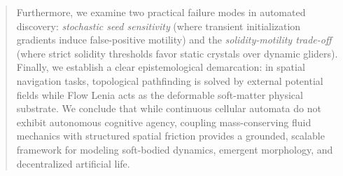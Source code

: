 \begin{abstract}
Furthermore, we examine two practical failure modes in automated discovery: \textit{stochastic seed sensitivity} (where transient initialization gradients induce false-positive motility) and the \textit{solidity-motility trade-off} (where strict solidity thresholds favor static crystals over dynamic gliders). Finally, we establish a clear epistemological demarcation: in spatial navigation tasks, topological pathfinding is solved by external potential fields while Flow Lenia acts as the deformable soft-matter physical substrate. We conclude that while continuous cellular automata do not exhibit autonomous cognitive agency, coupling mass-conserving fluid mechanics with structured spatial friction provides a grounded, scalable framework for modeling soft-bodied dynamics, emergent morphology, and decentralized artificial life.
\end{abstract}